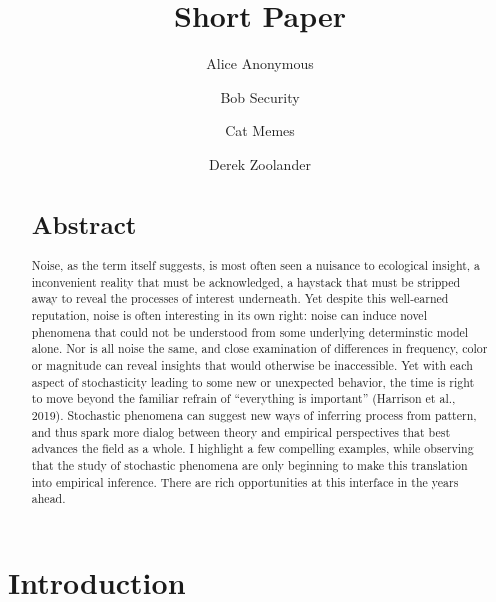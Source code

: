 \documentclass[review]{elsarticle} %
\begin{document}
\begin{frontmatter}

  \title{Short Paper}
    \author[Some Institute of Technology]{Alice Anonymous}
    \author[Another University]{Bob Security}
    \author[Another University]{Cat Memes}
    \author[Some Institute of Technology]{Derek Zoolander}
      \address[Some Institute of Technology]{Department, Street, City, State, Zip}
    \address[Another University]{Department, Street, City, State, Zip}
  
  \begin{abstract}
  \hypertarget{abstract}{%
  \section{Abstract}\label{abstract}}
  
  Noise, as the term itself suggests, is most often seen a nuisance to
  ecological insight, a inconvenient reality that must be acknowledged, a
  haystack that must be stripped away to reveal the processes of interest
  underneath. Yet despite this well-earned reputation, noise is often
  interesting in its own right: noise can induce novel phenomena that
  could not be understood from some underlying determinstic model alone.
  Nor is all noise the same, and close examination of differences in
  frequency, color or magnitude can reveal insights that would otherwise
  be inaccessible. Yet with each aspect of stochasticity leading to some
  new or unexpected behavior, the time is right to move beyond the
  familiar refrain of ``everything is important'' (Harrison et al., 2019).
  Stochastic phenomena can suggest new ways of inferring process from
  pattern, and thus spark more dialog between theory and empirical
  perspectives that best advances the field as a whole. I highlight a few
  compelling examples, while observing that the study of stochastic
  phenomena are only beginning to make this translation into empirical
  inference. There are rich opportunities at this interface in the years
  ahead.
  
  \newpage
  \end{abstract}
  
 \end{frontmatter}

\hypertarget{introduction}{%
\section{Introduction}\label{introduction}}
\end{document}
